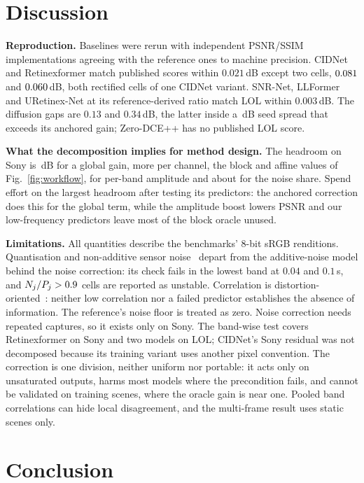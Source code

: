 \section{Discussion}
\label{sec:discussion}

\noindent\textbf{Reproduction.} Baselines were rerun with independent PSNR/SSIM implementations agreeing with the reference ones to machine precision. CIDNet and Retinexformer match published scores within \(0.021\)\,dB except two cells, \(0.081{}\) and \(0.060{}\)\,dB, both rectified cells of one CIDNet variant. SNR-Net, LLFormer and URetinex-Net at its reference-derived ratio match LOL within \(0.003\)\,dB. The diffusion gaps are \(0.13\) and \(0.34\)\,dB, the latter inside a \nLDspread{}\,dB seed spread that exceeds its anchored gain; Zero-DCE++ has no published LOL score.

\noindent\textbf{What the decomposition implies for method design.} The headroom on Sony is \nHRglob{}\,dB for a global gain, \nHRchan{} more per channel, the block and affine values of Fig.~\ref{fig:workflow}, \nHRbandls{} for per-band amplitude and about \nHRnoise{} for the noise share. Spend effort on the largest headroom after testing its predictors: the anchored correction does this for the global term, while the amplitude boost lowers PSNR and our low-frequency predictors leave most of the block oracle unused.

\noindent\textbf{Limitations.} All quantities describe the benchmarks' 8-bit sRGB renditions. Quantisation and non-additive sensor noise~\cite{eld2020,twoshots2026} depart from the additive-noise model behind the noise correction: its check fails in the lowest band at $0.04$ and $0.1$\,s, and $N_j/P_j>0.9{}$ cells are reported as unstable. Correlation is distortion-oriented~\cite{blau2018}: neither low correlation nor a failed predictor establishes the absence of information. The reference's noise floor is treated as zero. Noise correction needs repeated captures, so it exists only on Sony. The band-wise test covers Retinexformer on Sony and two models on LOL; CIDNet's Sony residual was not decomposed because its training variant uses another pixel convention. The correction is one division, neither uniform nor portable: it acts only on unsaturated outputs, harms most models where the precondition fails, and cannot be validated on training scenes, where the oracle gain is near one. Pooled band correlations can hide local disagreement, and the multi-frame result uses static scenes only.

\section{Conclusion}
\label{sec:conclusion}

